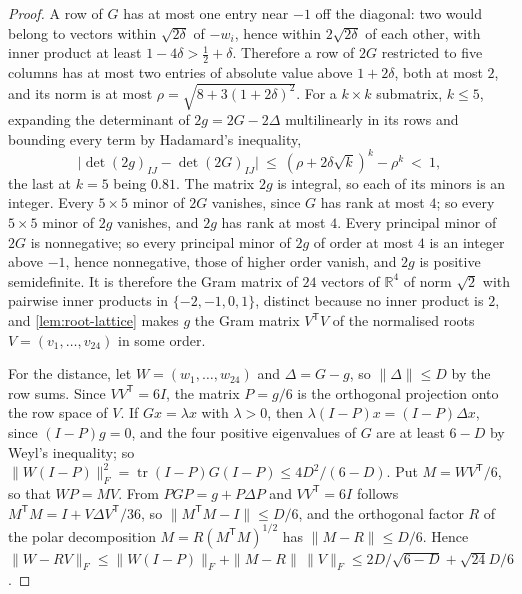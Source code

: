\documentclass[11pt,reqno]{amsart}
\renewcommand{\_}{\origunderscore\allowbreak}
\numberwithin{equation}{section}
\theoremstyle{plain}
\theoremstyle{definition}
\theoremstyle{remark}
\begin{document}
\begin{proof}
A row of $G$ has at most one entry near $-1$ off the diagonal: two
would belong to vectors within $\sqrt{2\delta}$ of $-w_i$, hence within
$2\sqrt{2\delta}$ of each other, with inner product at least
$1-4\delta>\tfrac12+\delta$. Therefore a row of $2G$ restricted to five columns
has at most two entries of absolute value above $1+2\delta$, both at most
$2$, and its norm is at most $\rho=\sqrt{8+3(1+2\delta)^2}$. For a $k\times
k$ submatrix, $k\le5$, expanding the determinant of $2g=2G-2\Delta$
multilinearly in its rows and bounding every term by Hadamard's
inequality,
\[
  \bigl|\det(2g)_{IJ}-\det(2G)_{IJ}\bigr|\ \le\ (\rho+2\delta\sqrt k)^k-\rho^k\ <\ 1 ,
\]
the last at $k=5$ being $0.81$. The matrix $2g$ is integral, so each of
its minors is an integer. Every $5\times5$ minor of $2G$ vanishes, since
$G$ has rank at most $4$; so every $5\times5$ minor of $2g$ vanishes, and
$2g$ has rank at most $4$. Every principal minor of $2G$ is nonnegative;
so every principal minor of $2g$ of order at most $4$ is an integer above
$-1$, hence nonnegative, those of higher order vanish, and $2g$ is
positive semidefinite. It is
therefore the Gram matrix of $24$ vectors of $\mathbb R^4$ of norm $\sqrt2$
with pairwise inner products in $\{-2,-1,0,1\}$, distinct because no
inner product is $2$, and \cref{lem:root-lattice} makes $g$ the Gram
matrix $V^{\mathsf T}V$ of the normalised roots $V=(v_1,\dots,v_{24})$ in
some order.

For the distance, let $W=(w_1,\dots,w_{24})$ and $\Delta=G-g$, so
$\|\Delta\|\le D$ by the row sums. Since $VV^{\mathsf T}=6I$, the matrix
$P=g/6$ is the orthogonal projection onto the row space of $V$. If
$Gx=\lambda x$ with $\lambda>0$, then $\lambda(I-P)x=(I-P)\Delta x$, since
$(I-P)g=0$, and the four positive eigenvalues of $G$ are at least $6-D$
by Weyl's inequality; so
$\|W(I-P)\|_F^2=\operatorname{tr}(I-P)G(I-P)\le4D^2/(6-D)$. Put
$M=WV^{\mathsf T}/6$, so that $WP=MV$. From $PGP=g+P\Delta P$ and
$VV^{\mathsf T}=6I$ follows $M^{\mathsf T}M=I+V\Delta V^{\mathsf T}/36$, so
$\|M^{\mathsf T}M-I\|\le D/6$, and the orthogonal factor $R$ of the polar
decomposition $M=R(M^{\mathsf T}M)^{1/2}$ has $\|M-R\|\le D/6$. Hence
$\|W-RV\|_F\le\|W(I-P)\|_F+\|M-R\|\,\|V\|_F\le2D/\sqrt{6-D}+\sqrt{24}D/6$.
\end{proof}
\end{document}
